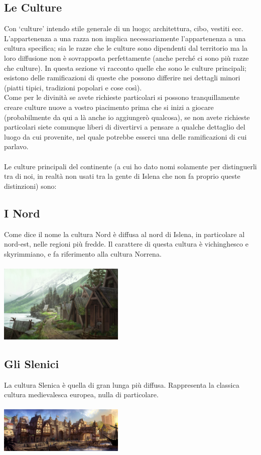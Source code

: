 \documentclass[10pt, a4paper]{report}
\begin{document}
\newpage
\begin{multicols}{2}
\section{Le Culture} 
Con \enquote*{culture} intendo stile generale di un luogo; architettura, cibo, vestiti ecc. L’appartenenza a una razza non implica necessariamente l’appartenenza a una cultura specifica; sia le razze che le culture sono dipendenti dal territorio ma la loro diffusione non è sovrapposta perfettamente (anche perché ci sono più razze che culture). In questa sezione vi racconto quelle che sono le culture principali; esistono delle ramificazioni di queste che possono differire nei dettagli minori (piatti tipici, tradizioni popolari e cose così).\\
Come per le divinità se avete richieste particolari si possono tranquillamente creare culture nuove a vostro piacimento prima che si inizi a giocare (probabilmente da qui a là anche io aggiungerò qualcosa), se non avete richieste particolari siete comunque liberi di divertirvi a pensare a qualche dettaglio del luogo da cui provenite, nel quale potrebbe esserci una delle ramificazioni di cui parlavo. \\
\\
Le culture principali del continente (a cui	ho dato nomi solamente per distinguerli tra di noi, in realtà non usati tra la gente di Islena che non fa proprio queste distinzioni) sono:\\

\subsection*{I Nord}
Come dice il nome la cultura Nord è diffusa al nord di Islena, in particolare al nord-est, nelle regioni più fredde. Il carattere di questa cultura è vichinghesco e skyrimmiano, e fa riferimento alla cultura Norrena.\\
\\
\includegraphics[width=6cm]{nord.jpg}

\subsection*{Gli Slenici}
La cultura Slenica è quella di gran lunga più diffusa. Rappresenta la classica cultura medievalesca europea, nulla di particolare.\\
\\
\includegraphics[width=6cm]{islenici.jpg}


\end{multicols}
\end{document}
